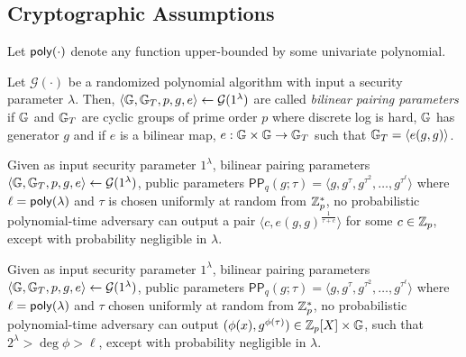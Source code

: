\subsection{Cryptographic Assumptions}
\label{s:assumptions}

Let $\mathsf{poly}(\cdot)$ denote any function upper-bounded by some univariate polynomial.

\begin{definition}
\label{d:bilinear-pairing-parameters}
Let $\mathcal{G}(\cdot)$ be a randomized polynomial algorithm with input a security parameter $\lambda$.
Then, $\langle \mathbb{G}, \mathbb{G}_T, p, g, e\rangle \leftarrow \mathcal{G}(1^\lambda)$ are called \textit{bilinear pairing parameters} if
$\mathbb{G}$ and $\mathbb{G}_T$ are cyclic groups of prime order $p$ where discrete log is hard, 
$\mathbb{G}$ has generator $g$
and if $e$ is a bilinear map, $e : \mathbb{G}\times \mathbb{G} \rightarrow \mathbb{G}_T$ such that $\mathbb{G}_T = \langle e(g,g) \rangle$.
\end{definition}

\begin{definition}
\label{d:q-sbdh}
Given as input security parameter $1^\lambda$, bilinear pairing parameters $\langle \mathbb{G}, \mathbb{G}_T, p, g, e\rangle \leftarrow \mathcal{G}(1^\lambda)$,
public parameters  $\mathsf{PP}_q(g;\tau)=\langle g, g^\tau, g^{\tau^2},\allowbreak \dots, g^{\tau^\ell}\rangle$ where $\ell = \mathsf{poly}(\lambda)$ and $\tau$ is chosen uniformly at random from $\mathbb{Z}_p^*$, no probabilistic polynomial-time adversary can output a pair $\langle c, e(g,g)^\frac{1}{\tau+c}\rangle$ for some $c \in \mathbb{Z}_p$, except with probability negligible in $\lambda$.
\end{definition}


\begin{definition}
\label{d:poly-dh}
Given as input security parameter $1^\lambda$, bilinear pairing parameters $\langle \mathbb{G}, \mathbb{G}_T, p, g, e\rangle \leftarrow \mathcal{G}(1^\lambda)$,
public parameters $\mathsf{PP}_q(g;\tau)=\langle g, g^\tau, g^{\tau^2},\allowbreak \dots, g^{\tau^\ell}\rangle$ where $\ell = \mathsf{poly}(\lambda)$ and $\tau$ chosen uniformly at random from $\mathbb{Z}_p^*$, no probabilistic polynomial-time adversary can output $(\phi(x), g^{\phi(\tau)}) \in \mathbb{Z}_p[X]\times \mathbb{G}$, such that $2^\lambda > \deg{\phi} > \ell$, except with probability negligible in $\lambda$.
\end{definition}

